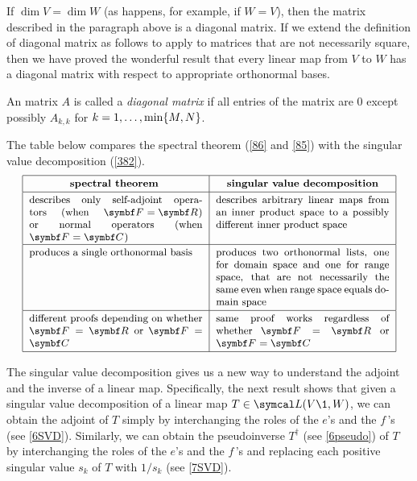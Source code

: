 If $\dim V = \dim W$ (as happens, for example, if $W = V$), then the matrix described in the paragraph above is a diagonal matrix. If we extend the definition of diagonal matrix as follows to apply to matrices that are not necessarily square, then we have proved the wonderful result that every linear map from $V$ to $W$ has a diagonal matrix with respect to appropriate orthonormal bases.

{An  matrix $A$ is called a \emph{diagonal matrix} if all entries of the matrix are $0$ except possibly $A_{k,k}$ for $k = 1, \ldots, \min \{M, N\}$.}

The table below compares the spectral theorem (\ref{86} and \ref{85}) with the singular value decomposition (\ref{382}).
\[
\begin{tabular}{|p{2.13in}|p{2.13in}|}
\hline
\vspace{-5bp}\hfil\small\textbf{spectral theorem} \vspace{1bp}
& \vspace{-5bp}\hfil\small\textbf{singular value decomposition}\\ \hline
\vspace{-5bp}\small describes only self-adjoint operators (when \mbox{$\F{} = \R{}$}) or normal operators (when \mbox{$\F{} = \C{}$})
& \vspace{-5bp}\small describes arbitrary linear maps from an inner product space to a possibly different inner product space\vspace{1bp}\\ \hline
\vspace{-5bp}\small produces a single orthonormal basis
& \vspace{-5bp}\small produces two orthonormal lists, one for domain space and one for range space, that are not necessarily the same even when range space equals domain space \vspace{1bp}\\ \hline
\vspace{-5bp}\small different proofs depending on whether $\F{} = \R{}$ or $\F{}=\C{}$ \vspace{1bp}
& \vspace{-5bp}\small same proof works regardless of whether $\F{} = \R{}$ or $\F{}=\C{}$ \\
\hline
\end{tabular}
\]

\smallskip

The singular value decomposition gives us a new way to understand the adjoint and the inverse of a linear map. Specifically, the next result shows that given a singular value decomposition of a linear map $T \in \L(V\1,W)$, we can obtain the adjoint of $T$ simply by interchanging the roles of the $e$'s and the $f\,$'s (see \ref{6SVD}). Similarly, we can obtain the pseudoinverse $T^\dagger$ (see \ref{6pseudo}) of $T$ by interchanging the roles of the $e$'s and the $f$\,'s and replacing each positive singular value $s_k$ of $T$ with $1/s_k$ (see \ref{7SVD}).

